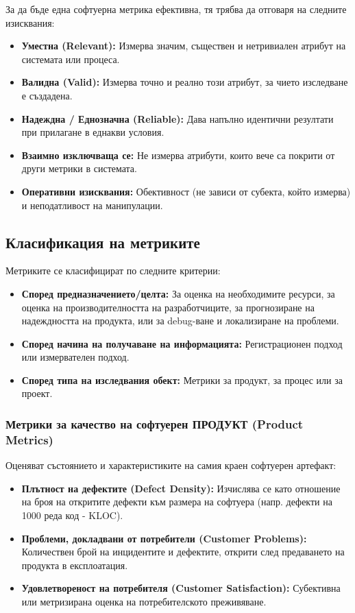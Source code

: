 \documentclass{scrartcl}
\begin{document}
\begin{FlushLeft}
За да бъде една софтуерна метрика ефективна, тя трябва да отговаря на следните изисквания:
\begin{itemize}
    \item \textbf{Уместна (Relevant):} Измерва значим, съществен и нетривиален атрибут на системата или процеса.
    \item \textbf{Валидна (Valid):} Измерва точно и реално този атрибут, за чието изследване е създадена.
    \item \textbf{Надеждна / Еднозначна (Reliable):} Дава напълно идентични резултати при прилагане в еднакви условия.
    \item \textbf{Взаимно изключваща се:} Не измерва атрибути, които вече са покрити от други метрики в системата.
    \item \textbf{Оперативни изисквания:} Обективност (не зависи от субекта, който измерва) и неподатливост на манипулации.
\end{itemize}

\subsection{Класификация на метриките}
Метриките се класифицират по следните критерии:
\begin{itemize}
    \item \textbf{Според предназначението/целта:} За оценка на необходимите ресурси, за оценка на производителността на разработчиците, за прогнозиране на надеждността на продукта, или за debug-ване и локализиране на проблеми.
    \item \textbf{Според начина на получаване на информацията:} Регистрационен подход или измервателен подход.
    \item \textbf{Според типа на изследвания обект:} Метрики за продукт, за процес или за проект.
\end{itemize}

\subsubsection{Метрики за качество на софтуерен ПРОДУКТ (Product Metrics)}
Оценяват състоянието и характеристиките на самия краен софтуерен артефакт:
\begin{itemize}
    \item \textbf{Плътност на дефектите (Defect Density):} Изчислява се като отношение на броя на откритите дефекти към размера на софтуера (напр. дефекти на 1000 реда код - KLOC).
    \item \textbf{Проблеми, докладвани от потребители (Customer Problems):} Количествен брой на инцидентите и дефектите, открити след предаването на продукта в експлоатация.
    \item \textbf{Удовлетвореност на потребителя (Customer Satisfaction):} Субективна или метризирана оценка на потребителското преживяване.
\end{itemize}


\end{FlushLeft}
\end{document}
